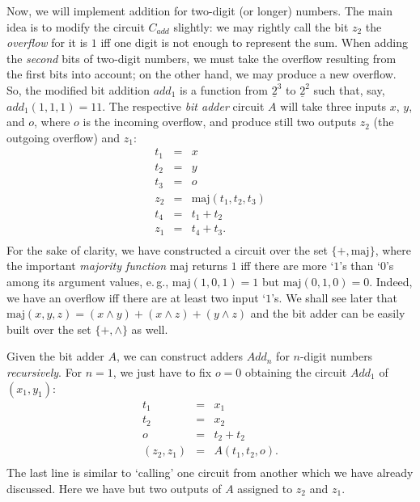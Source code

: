\documentclass[12pt,notitlepage]{article}
\theoremstyle{plain}
\theoremstyle{definition}
\theoremstyle{plain}
\newcommand{\ul}[1]{\underline{#1}}
\newcommand{\1}{\mathbf{1}}
\newcommand{\0}{\mathbf{0}}
\begin{document}
Now, we will implement addition for two-digit (or longer) numbers. The main idea is to modify the circuit $C_{add}$ slightly: we may rightly call the bit $z_2$ the \emph{overflow} for it is $1$ iff one digit is not enough to represent the sum. When adding the \emph{second} bits of two-digit numbers, we must take the overflow resulting from the first bits into account; on the other hand, we may produce a new overflow. So, the modified bit addition $add_1$ is a function from $\ul{2}^3$ to $\ul{2}^2$ such that, say, $add_1(1, 1, 1) = 11$. The respective \emph{bit adder} circuit $A$ will take three inputs $x$, $y$, and $o$, where $o$ is the incoming overflow, and produce still two outputs $z_2$ (the outgoing overflow) and $z_1$:
$$
\begin{array}{rcl}
t_1 &=& x\\
t_2 &=& y\\
t_3 &=& o\\
z_2 &=& \mathrm{maj}(t_1, t_2, t_3)\\
t_4 &=& t_1 + t_2\\
z_1 &=& t_4 + t_3.\\
\end{array}
$$
For the sake of clarity, we have constructed a circuit over the set $\{{+}, {\mathrm{maj}} \}$, where the important \emph{majority function}  $\mathrm{maj}$ returns $1$ iff there are more `$1$'s than `$0$'s among its argument values, e.\,g., $\mathrm{maj}(1,0,1) = 1$ but $\mathrm{maj}(0,1,0) = 0$. Indeed, we have an overflow iff there are at least two input `$1$'s. We shall see later that $\mathrm{maj}(x,y,z) = (x \wedge y) + (x \wedge z) + (y \wedge z)$ and the bit adder can be easily built over the set $\{{+}, {\wedge}\}$ as well.

Given the bit adder $A$, we can construct adders $Add_n$ for $n$-digit numbers \emph{recursively}. For $n = 1$, we just have to fix $o = 0$ obtaining the circuit $Add_1$ of $(x_1, y_1)$:
$$
\begin{array}{rcl}
t_1 &=& x_1\\
t_2 &=& x_2\\
o &=& t_2 + t_2\\
(z_2, z_1) &=& A(t_1, t_2, o).\\
\end{array}
$$
The last line is similar to `calling' one circuit from another which we have already discussed. Here we have but two outputs of $A$ assigned to $z_2$ and $z_1$.
\end{document}

